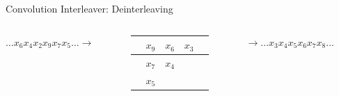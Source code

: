 \documentclass[aspectratio=169]{beamer}
\begin{document}
\begin{frame}{Convolution Interleaver: Deinterleaving}
    \begin{columns}[c]
    \begin{column}{4cm}
        $\ldots x_6 x_4 x_2 x_9 x_7 x_5 \ldots \to$
    \end{column}
    \hfill
    \begin{column}{3cm}
    \begin{table}
        \centering
        \begin{tabular}{c|c|c|c|c}
            \hline
            & $x_9$ & $x_6$ & $x_3$ & \\ \hline
            & $x_7$ & $x_4$ \\ \hline
            & $x_5$ \\ \hline
        \end{tabular}
    \end{table}
    \end{column}
    \hfill
    \begin{column}{5cm}
        $\to \ldots x_3 x_4 x_5 x_6 x_7 x_8 \ldots$
    \end{column}
    \end{columns}
\end{frame}
\end{document}
